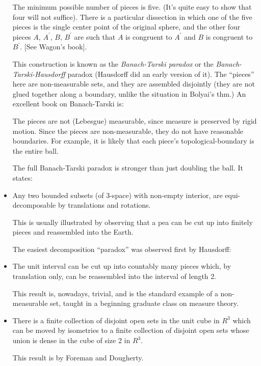 \begin{itemize}
  The minimum possible number of pieces is five.  (It's quite easy to
  show that four will not suffice).  There is a particular dissection in
  which one of the five pieces is the single center point of the
  original sphere, and the other four pieces $A$, $A^\prime$, $B$,
  $B^\prime$ are such that $A$ is congruent to $A^\prime$ and $B$ is
  congruent to $B^\prime$.  [See Wagon's book].

  This construction is known as the {\em Banach-Tarski paradox} or the
  {\em Banach-Tarski-Hausdorff} paradox (Hausdorff did an early version
  of it).  The ``pieces'' here are non-measurable sets, and they are
  assembled disjointly (they are not glued together along a boundary,
  unlike the situation in Bolyai's thm.)  An excellent book on
  Banach-Tarski is:





  The pieces are not (Lebesgue) measurable, since measure is preserved
  by rigid motion. Since the pieces are non-measurable, they do not have
  reasonable boundaries. For example, it is likely that each piece's
  topological-boundary is the entire ball.

  The full Banach-Tarski paradox is stronger than just doubling the
  ball.  It states:

  \item Any two bounded subsets (of $3$-space) with non-empty interior,
  are equi-decomposable by translations and rotations.

  This is usually illustrated by observing that a pea can be cut up into
  finitely pieces and reassembled into the Earth.

  The easiest decomposition ``paradox'' was observed first by Hausdorff:

  \item The unit interval can be cut up into countably many pieces
  which, by translation only, can be reassembled into the interval of
  length 2.

  This result is, nowadays, trivial, and is the standard example of a
  non-measurable set, taught in a beginning graduate class on measure
  theory.
  \item
  \begin{teo}
    There is a finite collection of disjoint open sets in the unit cube
    in $R^3$ which can be moved by isometries to a finite collection of
    disjoint open sets whose union is dense in the cube of size 2 in
    $R^3$.
  \end{teo}
  This result is by Foreman and Dougherty.


\end{itemize}
